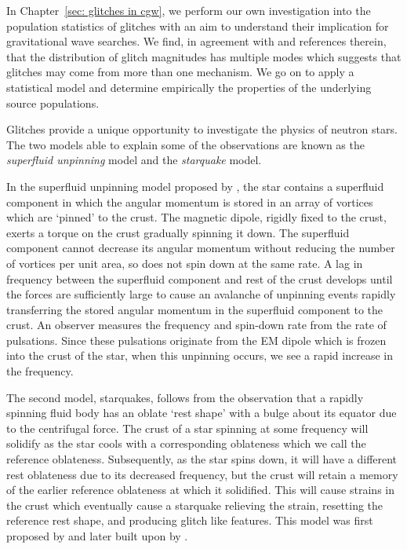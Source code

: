 In Chapter~\ref{sec: glitches in cgw}, we perform our own investigation into the
population statistics of glitches with an aim to understand their implication
for gravitational wave searches. We find, in agreement with
\citet{Espinoza2011} and references therein, that the distribution of glitch
magnitudes has multiple modes which suggests that glitches may come from more
than one mechanism. We go on to apply a statistical model and determine empirically
the properties of the underlying source populations.


Glitches provide a unique opportunity to investigate the physics of neutron
stars. The two models able to explain some of the observations are known as the
\emph{superfluid unpinning} model and the \emph{starquake} model.

In the superfluid unpinning model proposed by \citet{Anderson1975}, the star
contains a superfluid component in which the angular momentum is stored in an
array of vortices which are `pinned' to the crust. The magnetic dipole, rigidly
fixed to the crust, exerts a torque on the crust gradually spinning it down.
The superfluid component cannot decrease its angular momentum without reducing
the number of vortices per unit area, so does not spin down at the same rate. A
lag in frequency between the superfluid component and rest of the crust
develops until the forces are sufficiently large to cause an avalanche of
unpinning events rapidly transferring the stored angular momentum in the
superfluid component to the crust. An observer measures the frequency and
spin-down rate from the rate of pulsations. Since these pulsations originate from the
EM dipole which is frozen into the crust of the star, when this unpinning
occurs, we see a rapid increase in the frequency.

The second model, starquakes, follows from the observation that a rapidly
spinning fluid body has an oblate `rest shape' with a bulge about its equator
due to the centrifugal force. The crust of a star spinning at some frequency
will solidify as the star cools with a corresponding oblateness which we call
the reference oblateness. Subsequently, as the star spins down, it will have a
different rest oblateness due to its decreased frequency, but the crust will
retain a memory of the earlier reference oblateness at which it solidified.
This will cause strains in the crust which eventually cause a starquake
relieving the strain, resetting the reference rest shape, and producing glitch
like features. This model was first proposed by \citet{ruderman1969neutron} and later
built upon by \citet{Baym1971}.

